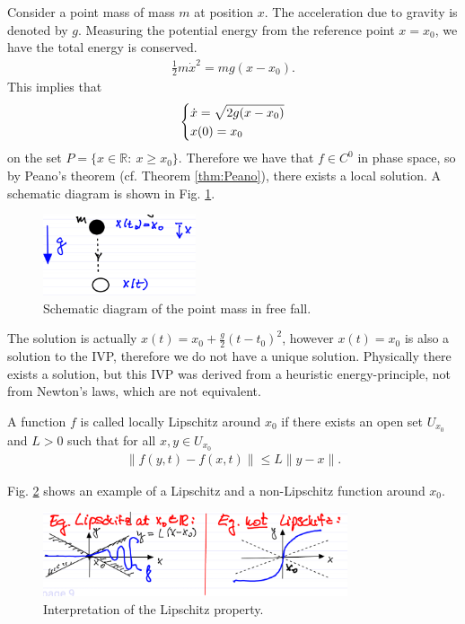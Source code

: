 \begin{ex}
	Consider a point mass of mass $m$ at position $x$. The acceleration due to gravity is denoted by $g$. Measuring the potential energy from the reference point $x=x_0$, we have the total energy is conserved.
	\begin{align}
		\frac{1}{2} m \dot{x}^2 = mg(x-x_0).
	\end{align}
This implies that
\begin{align}
	\begin{dcases}
		\dot{x} = \sqrt{2g(x-x_0)} \\
		x(0) = x_0
	\end{dcases}
\end{align}
on the set $P = \{ x \in \mathbb{R}:\ x \geq x_0\}$. Therefore we have that $f\in C^0$ in phase space, so by Peano's theorem (cf. Theorem \ref{thm:Peano}), there exists a local solution. A schematic diagram is shown in Fig. \ref{fig:point_mass}. 
	\begin{figure}[h!]
		\centering
		\includegraphics[width=0.4\textwidth]{figures/ch1/1freefall.png}
		\caption{Schematic diagram of the point mass in free fall.}
		\label{fig:point_mass}
	\end{figure}
	The solution is actually $x(t) = x_0 + \frac{g}{2}(t-t_0)^2$, however $x(t) = x_0$ is also a solution to the IVP, therefore we do not have a unique solution. Physically there exists a solution, but this IVP was derived from a heuristic energy-principle, not from Newton's laws, which are not equivalent.
\end{ex}
\begin{definition}
A function $f$ is called locally Lipschitz around $ {x}_0$ if there exists an open set $U_{ {x}_0}$ and $L>0$ such that for all $ {x}, {y} \in U_{ {x}_0}$
\begin{align}
	\boxed{\left \| f( {y},t) - f( {x},t)\right \| \leq L  \| {y} -  {x} \|.}
\end{align}
\end{definition}

\begin{ex}
	Fig. \ref{fig:Lipschitz_ex} shows an example of a Lipschitz and a non-Lipschitz function around $x_0$.
	\begin{figure}[h!]
		\centering
		\includegraphics[width=0.8\textwidth]{figures/ch1/2lipschitz.png}
		\caption{Interpretation of the Lipschitz property.}
		\label{fig:Lipschitz_ex}
	\end{figure}
\end{ex}


